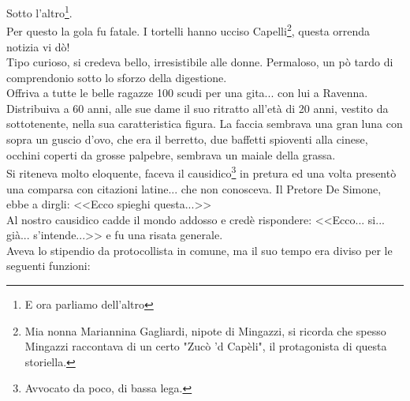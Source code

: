 Sotto l'altro\footnote{E ora parliamo dell'altro}. \\Per questo la gola fu fatale. I tortelli hanno ucciso Capelli\footnote{Mia nonna Mariannina Gagliardi, nipote di Mingazzi, si ricorda che spesso Mingazzi raccontava di un certo "Zucò 'd Capèli", il protagonista di questa storiella.}, questa orrenda notizia vi dò!\\
\indent Tipo curioso, si credeva bello, irresistibile alle donne. Permaloso, un pò tardo di comprendonio sotto lo sforzo della digestione.\\
\indent Offriva a tutte le belle ragazze 100 scudi per una gita... con lui a Ravenna. Distribuiva a 60 anni, alle sue dame il suo ritratto all'età di 20 anni, vestito da sottotenente, nella sua caratteristica figura. La faccia sembrava una gran luna con sopra un guscio d'ovo, che era il berretto, due baffetti spioventi alla cinese, occhini coperti da grosse palpebre, sembrava un maiale della grassa. \\
\indent Si riteneva molto eloquente, faceva il causidico\footnote{Avvocato da poco, di bassa lega.} in pretura ed una volta presentò una comparsa con citazioni latine... che non conosceva. Il Pretore De Simone, ebbe a dirgli: <<Ecco spieghi questa...>>\\
\indent Al nostro causidico cadde il mondo addosso e credè rispondere: <<Ecco... si... già... s'intende...>> e fu una risata generale.\\
\indent Aveva lo stipendio da protocollista in comune, ma il suo tempo era diviso per le seguenti funzioni:\\
